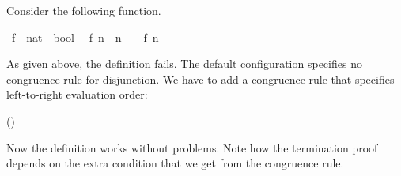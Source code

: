 \begin{isabellebody}
\begin{isamarkuptext}
  Consider the following function.%
\end{isamarkuptext}%
\isamarkuptrue%
\isamarkupfalse%
\ f\ {\isacharcolon}{\isacharcolon}\ {\isachardoublequoteopen}nat\ {\isasymRightarrow}\ bool{\isachardoublequoteclose}\isanewline
{}\isanewline
\ \ {\isachardoublequoteopen}f\ n\ {\isacharequal}\ {\isacharparenleft}n\ {\isacharequal}\ {}\ {\isasymor}\ f\ {\isacharparenleft}n\ {\isacharminus}\ {}{\isacharparenright}{\isacharparenright}{\isachardoublequoteclose}%
\isadelimproof
%
\endisadelimproof
%
\isatagproof
%
\endisatagproof
{\isafoldproof}%
%
\isadelimproof
%
\endisadelimproof
%
\begin{isamarkuptext}%
As given above, the definition fails. The default configuration
  specifies no congruence rule for disjunction. We have to add a
  congruence rule that specifies left-to-right evaluation order:

  \vspace{1ex}
  \noindent {}\hfill()
  \vspace{1ex}

  Now the definition works without problems. Note how the termination
  proof depends on the extra condition that we get from the congruence
  rule.


\end{isamarkuptext}
\end{isabellebody}
